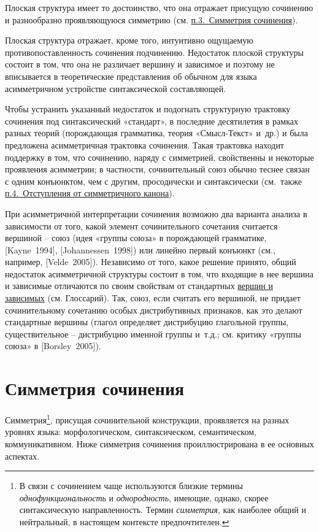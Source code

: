 Плоская структура имеет то достоинство, что она отражает присущую
сочинению и разнообразно проявляющуюся симметрию (см.
\underline{п.3.~Симметрия сочинения}).

Плоская структура отражает, кроме того, интуитивно ощущаемую
противопоставленность сочинения подчинению. Недостаток плоской структуры
состоит в том, что она не различает вершину и зависимое и поэтому не
вписывается в теоретические представления об обычном для языка
асимметричном устройстве синтаксической составляющей.

Чтобы устранить указанный недостаток и подогнать структурную трактовку
сочинения под синтаксический «стандарт», в последние десятилетия в
рамках разных теорий (порождающая грамматика, теория «Смысл-Текст»
и~др.) и была предложена асимметричная трактовка сочинения. Такая
трактовка находит поддержку в том, что сочинению, наряду с симметрией,
свойственны и некоторые проявления асимметрии; в частности,
сочинительный союз обычно теснее связан с одним конъюнктом, чем с
другим, просодически и синтаксически (см.~также
\underline{п.4.~Отступления от симметричного канона}).

При асимметричной интерпретации сочинения возможно два варианта анализа
в зависимости от того, какой элемент сочинительного сочетания считается
вершиной -- союз (идея «группы союза» в порождающей грамматике,
{[}Kayne~1994{]}, {[}Johannessen~1998{]}) или линейно первый конъюнкт
(см., например, {[}Velde~2005{]}). Независимо от того, какое решение
принято, общий недостаток асимметричной структуры состоит в том, что
входящие в нее вершина и зависимые отличаются по своим свойствам от
стандартных \underline{вершин и зависимых} (см. Глоссарий). Так, союз,
если считать его вершиной, не придает сочинительному сочетанию особых
дистрибутивных признаков, как это делают стандартные вершины (глагол
определяет дистрибуцию глагольной группы, существительное -- дистрибуцию
именной группы и~т.д.; см. критику «группы союза» в {[}Borsley~2005{]}).

\hypertarget{ux441ux438ux43cux43cux435ux442ux440ux438ux44f-ux441ux43eux447ux438ux43dux435ux43dux438ux44f}{%
\section{Симметрия
сочинения}\label{ux441ux438ux43cux43cux435ux442ux440ux438ux44f-ux441ux43eux447ux438ux43dux435ux43dux438ux44f}}

Симметрия\footnote{В связи с сочинением чаще используются близкие
  термины \emph{однофункциональность} и \emph{однородность}, имеющие,
  однако, скорее синтаксическую направленность. Термин \emph{симметрия},
  как наиболее общий и нейтральный, в настоящем контексте
  предпочтителен.}, присущая сочинительной конструкции, проявляется на
разных уровнях языка: морфологическом, синтаксическом, семантическом,
коммуникативном. Ниже симметрия сочинения проиллюстрирована в ее
основных аспектах.

